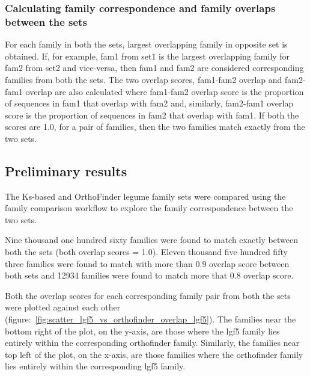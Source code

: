 \documentclass{article}
\begin{document}
			\subsubsection{Calculating family correspondence and family overlaps between the sets}
			For each family in both the sets, largest overlapping family in opposite set  is obtained. If, for example, fam1 from set1 is the largest overlapping family for fam2 from set2 and vice-versa, then fam1 and fam2 are considered corresponding families from both the sets. The two overlap scores, fam1-fam2 overlap and fam2-fam1 overlap are also calculated where fam1-fam2 overlap score is the proportion of sequences in fam1 that overlap with fam2 and, similarly, fam2-fam1 overlap score is the proportion of sequences in fam2 that overlap with fam1. If both the scores are 1.0, for a pair of families, then the two families match exactly from the two sets.
			
		\subsection{Preliminary results}
		The Ks-based and OrthoFinder legume family sets were compared using the family comparison workflow to explore the family correspondence between the two sets.
		
		Nine thousand one hundred sixty families were found to match exactly between both the sets (both overlap scores = 1.0). Eleven thousand five hundred fifty three families were found to match with more than 0.9 overlap score between both sets and 12934 families were found to match more that 0.8 overlap score.
		
		Both the overlap scores for each corresponding family pair from both the sets were plotted against each other (figure:~\ref{fig:scatter_lgf5_vs_orthofinder_overlap_lgf5}). The families near the bottom right of the plot, on the y-axis, are those where the lgf5 family lies entirely within the corresponding orthofinder family. Similarly, the families near top left of the plot, on the x-axis,  are those families where the orthofinder family lies entirely within the corresponding lgf5 family.
		  
\end{document}
